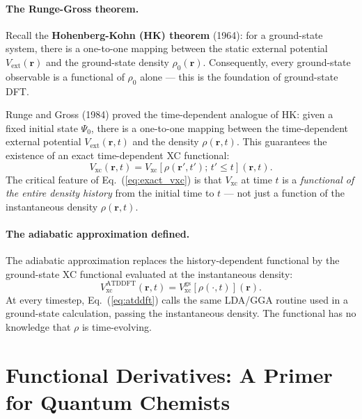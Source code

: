 \documentclass[12pt,letterpaper]{article}
\newcommand{\Vxc}{V_{\mathrm{xc}}}
\theoremstyle{definition}
\begin{document}
\paragraph{The Runge-Gross theorem.}
Recall the \textbf{Hohenberg-Kohn (HK) theorem} (1964): for a
ground-state system, there is a one-to-one mapping between the static
external potential $V_{\mathrm{ext}}(\bm{r})$ and the ground-state density
$\rho_0(\bm{r})$.
Consequently, every ground-state observable is a functional of $\rho_0$
alone — this is the foundation of ground-state DFT.

Runge and Gross (1984) proved the time-dependent analogue of HK: given a fixed
initial state $\Psi_0$, there is
a one-to-one mapping between the time-dependent external potential
$V_{\mathrm{ext}}(\bm{r},t)$ and the density $\rho(\bm{r},t)$.
This guarantees the existence of an exact time-dependent XC functional:
\begin{equation}
  \Vxc(\bm{r},t) = \Vxc\!\left[\rho(\bm{r}',t');\,t'\leq t\right](\bm{r},t).
  \label{eq:exact_vxc}
\end{equation}
The critical feature of Eq.~(\ref{eq:exact_vxc}) is that $\Vxc$ at time $t$
is a \emph{functional of the entire density history} from the initial time
to $t$ --- not just a function of the instantaneous density $\rho(\bm{r},t)$.

\paragraph{The adiabatic approximation defined.}
The adiabatic approximation replaces the history-dependent functional by
the ground-state XC functional evaluated at the instantaneous density:
\begin{equation}
  \boxed{\Vxc^{\mathrm{ATDDFT}}(\bm{r},t) = \Vxc^{\mathrm{gs}}\!\left[\rho(\cdot,t)\right](\bm{r})}.
  \label{eq:atddft}
\end{equation}
At every timestep, Eq.~(\ref{eq:atddft}) calls the same LDA/GGA routine
used in a ground-state calculation, passing the instantaneous density.
The functional has no knowledge that $\rho$ is time-evolving.

\section{Functional Derivatives: A Primer for Quantum Chemists}
\label{sec:funcderiv}
\end{document}
